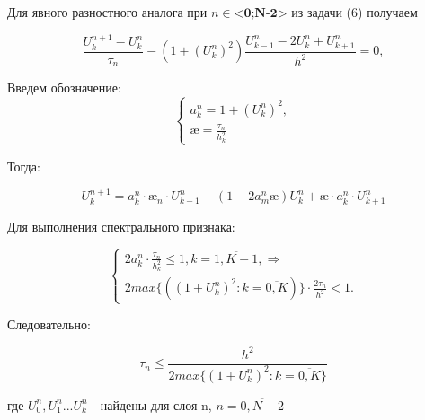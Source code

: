 \documentclass[__main__.tex]{subfiles}
\begin{document}
Для явного разностного аналога при $n \in \textbf{<0;N-2>}$ из задачи (6) получаем 

\begin{equation} \label{42.7}
\frac{U^{n+1}_k - U^{n}_k}{\tau_n} - (1 + (U^n_k)^2)\frac{U^{n}_{k-1} - 2U^{n}_k + U^n_{k+1}}{h^2} = 0,
\end{equation} 

Введем обозначение:
 \begin{equation} \label{42.8}
 \begin{cases}
 a^n_k = 1 + (U^n_k)^2, \\
 \text{\ae} = \frac{\tau_n}{h^2_k}
 \end{cases}
 \end{equation} 
 
Тогда:

 \begin{equation} \label{42.9}
U^{n+1}_k = a^n_k \cdot \text{\ae}_n \cdot U^n_{k-1} + (1 - 2a^n_m \text{\ae})U^n_k + \text{\ae} \cdot a^n_k \cdot U^n_{k+1}
\end{equation} 
 
 Для выполнения спектрального признака:
 
 \begin{equation} \label{42.10}
 \begin{cases}
  2a^n_k \cdot \frac{\tau_n}{h^2_k} \leq 1, k = \overline{1,K-1}, \Rightarrow \\
  2max \{((1 + U^n_k)^2:  k = \overline{0,K})\} \cdot \frac{2\tau_n}{h^2} < 1.
  \end{cases}
 \end{equation} 
 
 Следовательно:
 
 \begin{equation} \label{42.11}
 \tau_n \leq \frac{h^2}{2max \{(1 + U^n_k)^2:  k = \overline{0,K}\}}
 \end{equation} 
 
 где $U^n_0, U^n_1 ... U^n_k$ - найдены для слоя n, $n = \overline{0,N-2}$
 
\end{document}
